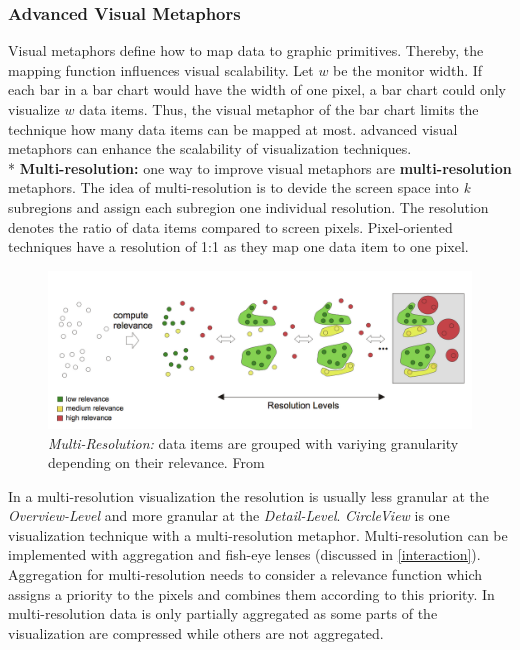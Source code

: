 \subsubsection*{Advanced Visual Metaphors}
Visual metaphors define how to map data to graphic primitives. Thereby, the mapping function influences visual scalability. 
 Let $w$ be the monitor width. If each bar in a bar chart would have the width of one pixel, a bar chart could only visualize  $w$ data items. Thus, the visual metaphor of the bar chart limits the technique how many data items can be mapped at most. advanced visual metaphors can enhance the scalability of visualization techniques\cite{Eick2002}. \\*
 \textbf{Multi-resolution:} one way to improve visual metaphors are \textbf{multi-resolution} metaphors\cite{Keim2005}. The idea of multi-resolution is to devide the screen space into \textit{k} subregions and assign each subregion one individual resolution. The resolution denotes the ratio of data items compared to screen pixels. Pixel-oriented techniques have a resolution of 1:1 as they map one data item to one pixel. 
 \begin{figure}
     \centering
     \includegraphics{src/images/multi-resolution}
     \caption{\textit{Multi-Resolution: }data items are grouped with variying granularity depending on their relevance. From \cite{Keim2005}}
     \label{multi-resolution}
 \end{figure}
 In a multi-resolution visualization the resolution is usually less granular at the \textit{Overview-Level} and more granular at the \textit{Detail-Level}. \textit{CircleView} is one visualization technique with a multi-resolution metaphor.
Multi-resolution can be implemented with aggregation and fish-eye lenses (discussed in \ref{interaction}). Aggregation for multi-resolution needs to consider a relevance function which assigns a priority to the pixels and combines them according to this priority. In multi-resolution data is only partially aggregated as some parts of the visualization are compressed while others are not aggregated.
